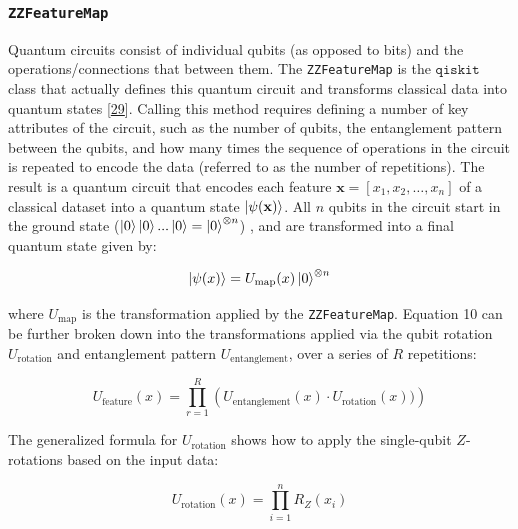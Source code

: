\documentclass[11pt, oneside]{article}   	%
\begin{document}


\subsubsection{\texttt{ZZFeatureMap}}

Quantum circuits consist of individual qubits (as opposed to bits) and the operations/connections that between them. The \texttt{ZZFeatureMap} is the $\texttt{qiskit}$ class that actually defines this quantum circuit and transforms classical data into quantum states [\href{https://doi.org/10.48550/arXiv.2405.08810}{29}]. Calling this method requires defining a number of key attributes of the circuit, such as the number of qubits, the entanglement pattern between the qubits, and how many times the sequence of operations in the circuit is repeated to encode the data (referred to as the number of repetitions). The result is a quantum circuit that encodes each feature $\mathbf{x} = [x_1, x_2, \ldots, x_n]$ of a classical dataset into a quantum state $\ket{\psi(\mathbf{x})}$. All $n$ qubits in the circuit start in the ground state ($\ket{0} \ket{0} ... \ket{0} = \ket{0}^{\otimes n}$) , and are transformed into a final quantum state given by:

\begin{equation}
	\ket{\psi(x)} = U_{\text{map}}(x)\ket{0}^{\otimes n}
\end{equation}

\noindent where $U_{\text{map}}$ is the transformation applied by the \texttt{ZZFeatureMap}. Equation 10 can be further broken down into the transformations applied via the qubit rotation $U_{\text{rotation}}$ and entanglement pattern $U_{\text{entanglement}}$, over a series of $R$ repetitions:

\begin{equation}
	U_{\text{feature}}(x) = \prod_{r=1}^{R} \left( U_{\text{entanglement}}(x) \cdot U_{\text{rotation}}(x)) \right)
\end{equation}

The generalized formula for $U_{\text{rotation}}$ shows how to apply the single-qubit $Z$-rotations based on the input data:

\begin{equation}
	U_{\text{rotation}}(x) = \prod_{i=1}^{n} R_Z(x_i)
\end{equation}
\end{document}
